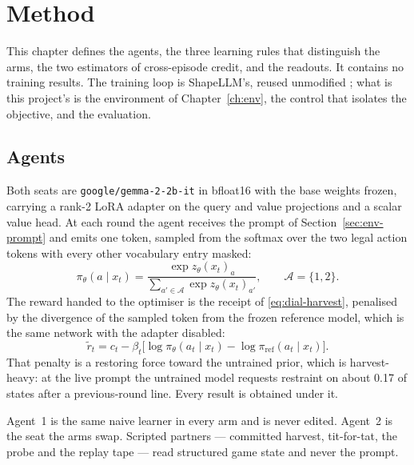 \chapter{Method}
\label{ch:method}


This chapter defines the agents, the three learning rules that distinguish
the arms, the two estimators of cross-episode credit, and the readouts.
It contains no training results.
The training loop is ShapeLLM's, reused unmodified
\cite{garciasegura2025}; what is this project's is the environment of
Chapter~\ref{ch:env}, the control that isolates the objective, and the
evaluation.

\section{Agents}
\label{sec:method-agents}

Both seats are \texttt{google/gemma-2-2b-it} in bfloat16 with the base
weights frozen, carrying a rank-2 LoRA adapter \cite{hu2022} on the query
and value projections and a scalar value head.
At each round the agent receives the prompt of Section~\ref{sec:env-prompt}
and emits one token, sampled from the softmax over the two legal action
tokens with every other vocabulary entry masked:
\begin{equation}
  \pi_{\theta}(a\mid x_t)=
  \frac{\exp z_{\theta}(x_t)_a}{\sum_{a'\in\mathcal{A}}\exp z_{\theta}(x_t)_{a'}},
  \qquad \mathcal{A}=\{1,2\}.
  \label{eq:policy}
\end{equation}
The reward handed to the optimiser is the receipt of
\eqref{eq:dial-harvest}, penalised by the divergence of the sampled token
from the frozen reference model, which is the same network with the adapter
disabled:
\begin{equation}
  \tilde{r}_t=c_t-\beta_t\bigl[\log\pi_{\theta}(a_t\mid x_t)-\log\pi_{\mathrm{ref}}(a_t\mid x_t)\bigr].
  \label{eq:klreward}
\end{equation}
That penalty is a restoring force toward the untrained prior, which is
harvest-heavy: at the live prompt the untrained model requests restraint on
about 0.17 of states after a previous-round line.
Every result is obtained under it.

Agent~1 is the same naive learner in every arm and is never edited.
Agent~2 is the seat the arms swap.
Scripted partners --- committed harvest, tit-for-tat, the probe and the
replay tape --- read structured game state and never the prompt.

